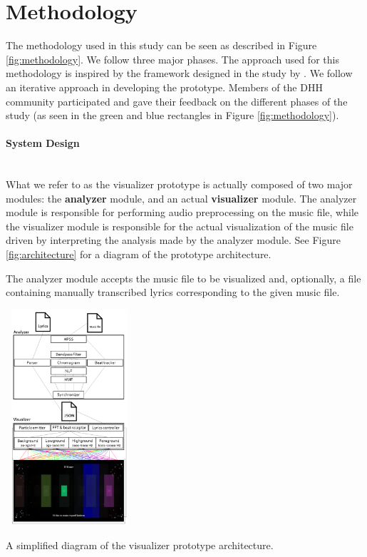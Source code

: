 \documentclass{sigchi-ext}
\begin{document}
\section{Methodology}
The methodology used in this study can be seen as described in Figure \ref{fig:methodology}. We follow three major phases. The approach used for this methodology is inspired by the framework designed in the study by \cite{deja2019myosl}. We follow an iterative approach in developing the prototype. Members of the DHH community participated and gave their feedback on the different phases of the study (as seen in the green and blue rectangles in Figure \ref{fig:methodology}).

\paragraph{System Design}\mbox{} \\
What we refer to as the visualizer prototype is actually composed of two major modules: the \textbf{analyzer} module, and an actual \textbf{visualizer} module. The analyzer module is responsible for performing audio preprocessing on the music file, while the visualizer module is responsible for the actual visualization of the music file driven by interpreting the analysis made by the analyzer module. See Figure \ref{fig:architecture} for a diagram of the prototype architecture.



The analyzer module accepts the music file to be visualized and, optionally, a file containing manually transcribed lyrics corresponding to the given music file. 

\begin{marginfigure}[-8pc]
\begin{minipage}{\marginparwidth}
     \includegraphics[width=4.75cm,height=8cm]{figures/ArchitectureLBW.png}
    \caption{A simplified diagram of the visualizer prototype architecture.}
    \label{fig:architecture}
    \end{minipage}
\end{marginfigure}
\end{document}
